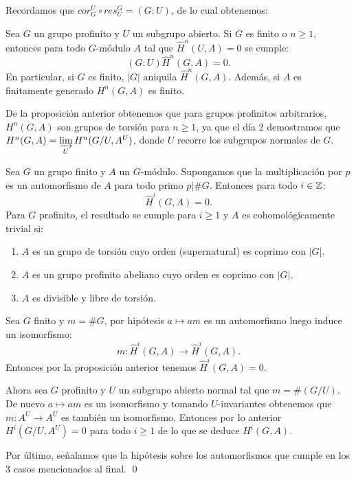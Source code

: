\documentclass[a4paper,12pt, leqno]{article}
\begin{document}
	Recordamos que $cor^U_G \circ res^G_U=(G:U)$, de lo cual obtenemos:
	\begin{prop}
		Sea $G$ un grupo profinito y $U$ un subgrupo abierto. Si $G$ es finito o $n \geq 1$, entonces para todo $G$-módulo $A$ tal que $\hat{H}^n(U,A)=0$ se cumple:
		\begin{equation*}
		(G:U)\hat{H}^n(G,A)=0.
		\end{equation*}	
		En particular, si $G$ es finito, $|G|$ aniquila $\hat{H}^n(G,A)$. Además, si $A$ es finitamente generado $H^n(G,A)$ es finito. 
	\end{prop}
	De la proposición anterior obtenemos que para grupos profinitos arbitrarios, $H^n(G,A)$ son grupos de torsión para $n\geq 1$, ya que el día 2 demostramos que $H^n(G,A)= \varinjlim\limits_{U} H^n(G/U,A^U)$, donde $U$ recorre los subgrupos normales de  $G$. 
	\begin{prop}
		Sea $G$ un grupo finito y $A$ un $G$-módulo. Supongamos que la multiplicación por $p$ es un automorfismo de $A$ para todo primo $p | \#G$. Entonces para todo $i\in \mathbb{Z}$:
		\begin{equation*}
		\hat{H}^i(G,A)=0.
		\end{equation*}
		Para $G$ profinito, el resultado se cumple para $i\geq 1$ y $A$ es cohomológicamente trivial si:
		\begin{enumerate}
			\item $A$ es un grupo de torsión cuyo orden (supernatural) es coprimo con $|G|$.
			\item $A$ es un grupo profinito abeliano cuyo orden es coprimo con $|G|$.
			\item $A$ es divisible y libre de torsión. 
		\end{enumerate}	
	\end{prop}
	\begin{dem}
		Sea $G$ finito y $m=\#G$, por hipótesis $a \mapsto am$ es un automorfismo luego induce un isomorfismo:
		\begin{equation*}
		m: \hat{H}^i(G,A)\rightarrow \hat{H}^i(G,A).
		\end{equation*}
		Entonces por la proposición anterior tenemos $\hat{H}^i(G,A)=0$.
		
		Ahora sea $G$ profinito y $U$ un subgrupo abierto normal tal que $m=\#(G/U)$. De nuevo $a \mapsto am$ es  un isomorfismo y tomando $U$-invariantes obtenemos que $m: A^U \rightarrow A^U$ es también un isomorfismo. Entonces por lo anterior $H^i(G/U,A^U)=0$ para todo $i \geq 1$ de lo que se deduce $H^i(G,A)$.
		
		Por último, señalamos que la hipótesis sobre los automorfismos que cumple en los 3 casos mencionados al final. \qed
	\end{dem}
\end{document}
